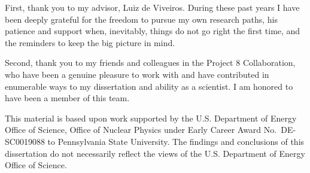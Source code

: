 
First, thank you to my advisor, Luiz de Viveiros. During these past years I have been deeply grateful for the freedom to pursue my own research paths, his patience and support when, inevitably, things do not go right the first time, and the reminders to keep the big picture in mind. 

Second, thank you to my friends and colleagues in the Project 8 Collaboration, who have been a genuine pleasure to work with and have contributed in enumerable ways to my dissertation and ability as a scientist. I am honored to have been a member of this team.

This material is based upon work supported by the U.S. Department of Energy Office of Science, Office of Nuclear Physics under Early Career Award No.~DE-SC0019088 to Pennsylvania State University. The findings and conclusions of this dissertation do not necessarily reflect the views of the U.S. Department of Energy Office of Science.
